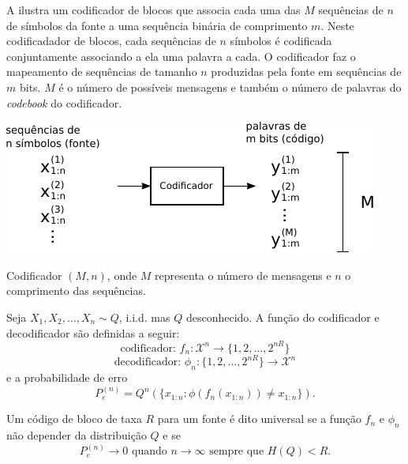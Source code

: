 A  ilustra um codificador de blocos que associa cada uma das $M$ sequências de $n$ de símbolos
da fonte a uma sequência binária de comprimento $m$.
Neste codificadador de blocos, cada sequências de $n$ símbolos é codificada conjuntamente
associando a ela uma palavra a cada. O codiﬁcador faz o mapeamento de sequências de tamanho $n$ produzidas pela fonte em
sequências de $m$ bits.
$M$ é o número de possíveis mensagens e também o número de palavras do \emph{codebook} do codificador.
\begin{marginfigure}%
  \includegraphics[width=\linewidth]{figures/Mncodes2.pdf}
  \caption{Codificador $(M,n)$, onde $M$ representa o número de mensagens e $n$ o comprimento das sequências.}
  \label{fig:Mncodes2}
\end{marginfigure}

\begin{definition}
Seja $X_1, X_2, \ldots, X_n \sim Q$, i.i.d. mas $Q$ desconhecido. A função do codificador
e decodificador são definidas a seguir:
  \begin{equation}
  \text{codificador: } f_n : \mathcal{X}^n \rightarrow \{1,2,\ldots,2^{nR}\}
  \end{equation}
  \begin{equation}
  \text{decodificador: } \phi_n : \{1,2,\ldots,2^{nR}\} \rightarrow \mathcal{X}^n
  \end{equation}
e a probabilidade de erro
  \begin{equation}
  P_e^{(n)} = Q^n (\{ x_{1:n} : \phi (f_n (x_{1:n})) \neq x_{1:n} \}) .
  \end{equation}
\end{definition}

\begin{definition}
  Um código de bloco de taxa $R$ para um fonte é dito universal se a função $f_n$ e $\phi_n$
  não depender da distribuição $Q$ e se
  \begin{equation}
    P_e^{(n)} \rightarrow 0 \text{ quando } n \rightarrow \infty \text{ sempre que } H(Q) < R .
  \end{equation}
\end{definition}

